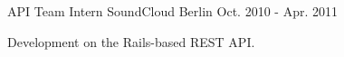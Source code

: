 \begin{cventries}
  \cventry
    {API Team Intern} %
    {SoundCloud} %
    {Berlin} %
    {Oct. 2010 - Apr. 2011} %
    {
      \begin{cvitems} %
        \item {Development on the Rails-based REST API.}
      \end{cvitems} 
    }

\end{cventries}

